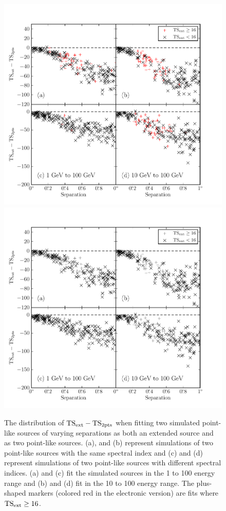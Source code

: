 \clearpage
\begin{figure}
    \ifcolorfigure
    \includegraphics{mc_plots/confusion_2pts_plot_color.pdf}
    \else
    \includegraphics{mc_plots/confusion_2pts_plot_bw.pdf}
    \fi
    \caption{
    The distribution of $\mathrm{TS}_\mathrm{ext}-\mathrm{TS}_{\mathrm{2pts}}$ when fitting two simulated
    point-like sources of varying separations as
    both an extended source and as two point-like sources.  (a),
    and (b) represent simulations of two point-like sources with the
    same spectral index and (c) and (d) represent simulations of two
    point-like sources with different spectral indices.  (a) and (c)
    fit the simulated sources in the 1 \gev to 100 \gev energy range
    and (b) and (d) fit in the 10 \gev to 100 \gev energy range.
    The plus-shaped markers (colored red in the electronic version)
    are fits where $\mathrm{TS}_\mathrm{ext}\ge16$.
    }
  \end{figure}


